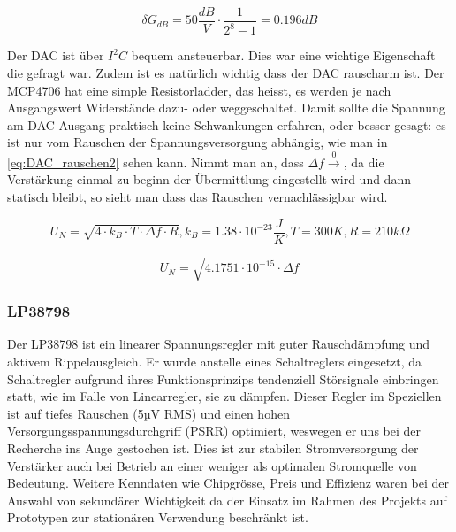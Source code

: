 \begin{equation}
    \delta G_{dB} = 50 \frac{dB}{V} \cdot \frac{1}{2^8 - 1} = 0.196 dB
\label{eq:DAC_wert}
\end{equation}

Der DAC ist über $I^2 C$ bequem ansteuerbar. Dies war eine wichtige Eigenschaft die gefragt war. Zudem ist es natürlich wichtig dass der DAC rauscharm ist. Der MCP4706 hat eine simple Resistorladder, das heisst, es werden je nach Ausgangswert Widerstände dazu- oder weggeschaltet. Damit sollte die Spannung am DAC-Ausgang praktisch keine Schwankungen erfahren, oder besser gesagt: es ist nur vom Rauschen der Spannungsversorgung abhängig, wie man in \ref{eq:DAC_rauschen2} sehen kann. Nimmt man an, dass $\Delta f \xrightarrow 0$, da die Verstärkung einmal zu beginn der Übermittlung eingestellt wird und dann statisch bleibt, so sieht man dass das Rauschen vernachlässigbar wird.

\begin{equation}
    U_N = \sqrt{4 \cdot k_B \cdot T \cdot \Delta f \cdot R}, k_B = 1.38\cdot 10^{-23}\frac{J}{K}, T = 300K, R = 210k\Omega
\label{eq:DAC_rauschen}
\end{equation}

\begin{equation}
    U_N = \sqrt{4.1751\cdot 10^{-15} \cdot \Delta f}
\label{eq:DAC_rauschen2}
\end{equation}

\subsubsection{LP38798}
Der LP38798 ist ein linearer Spannungsregler mit guter Rauschdämpfung und aktivem Rippelausgleich. Er wurde anstelle eines Schaltreglers eingesetzt, da Schaltregler aufgrund ihres Funktionsprinzips tendenziell Störsignale einbringen statt, wie im Falle von Linearregler, sie zu dämpfen.
Dieser Regler im Speziellen ist auf tiefes Rauschen (5µV RMS) und einen hohen Versorgungsspannungsdurchgriff (PSRR) optimiert, weswegen er uns bei der Recherche ins Auge gestochen ist. Dies ist zur stabilen Stromversorgung der Verstärker auch bei Betrieb an einer weniger als optimalen Stromquelle von Bedeutung.
Weitere Kenndaten wie Chipgrösse, Preis und Effizienz waren bei der Auswahl von sekundärer Wichtigkeit da der Einsatz im Rahmen des Projekts auf Prototypen zur stationären Verwendung beschränkt ist.



